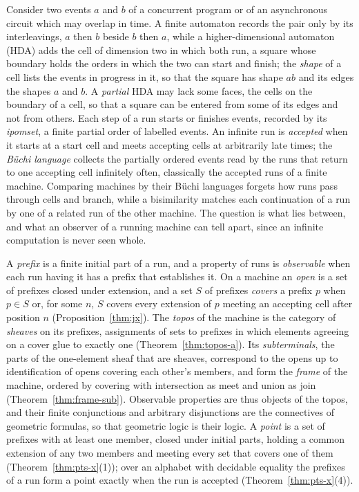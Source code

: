 \documentclass{lmcs}
\theoremstyle{definition}
\theoremstyle{remark}
\begin{document}
Consider two events $a$ and $b$ of a concurrent program or of an asynchronous circuit which may overlap in time. A
finite automaton records the pair only by its interleavings, $a$ then $b$ beside $b$ then $a$, while a
higher-dimensional automaton (HDA) adds the cell of dimension two in which both run, a square whose boundary holds the
orders in which the two can start and finish; the \emph{shape} of a cell lists the events in progress in it, so that
the square has shape $ab$ and its edges the shapes $a$ and $b$. A \emph{partial} HDA may lack some faces, the cells on
the boundary of a cell, so that a square can be entered from some of its edges and not from others. Each step of a run
starts or finishes events, recorded by its \emph{ipomset}, a finite partial order of labelled events. An infinite run
is \emph{accepted} when it starts at a start cell and meets accepting cells at arbitrarily late times; the
\emph{B\"uchi language} collects the partially ordered events read by the runs that return to one accepting cell
infinitely often, classically the accepted runs of a finite machine. Comparing machines by their B\"uchi languages forgets how
runs pass through cells and branch, while a bisimilarity matches each continuation of a run by one of a related run of
the other machine. The question is what lies between, and what an observer of a running machine can tell apart, since
an infinite computation is never seen whole.

A \emph{prefix} is a finite initial part of a run, and a property of runs is \emph{observable} when each run having it
has a prefix that establishes it. On a machine an \emph{open} is a set of prefixes closed under extension, and a set
$S$ of prefixes \emph{covers} a prefix $p$ when $p\in S$ or, for some $n$, $S$ covers every extension of $p$ meeting
an accepting cell after position $n$ (Proposition~\ref{thm:jx}). The \emph{topos} of the machine is the category of
\emph{sheaves} on its prefixes, assignments of sets to prefixes in which elements agreeing on a cover glue to exactly
one (Theorem~\ref{thm:topos-a}). Its \emph{subterminals}, the parts of the one-element sheaf that are sheaves,
correspond to the opens up to identification of opens covering each other's members, and form the \emph{frame} of the
machine, ordered by covering with intersection as meet and union as join (Theorem~\ref{thm:frame-sub}). Observable
properties are thus objects of the topos, and their finite conjunctions and arbitrary disjunctions are the connectives
of geometric formulas, so that geometric logic is their logic. A \emph{point} is a set of prefixes with at least one
member, closed under initial parts, holding a common extension of any two members and meeting every set that covers
one of them (Theorem~\ref{thm:pts-x}(1)); over an alphabet with decidable equality the prefixes of a run form a point
exactly when the run is accepted (Theorem~\ref{thm:pts-x}(4)).
\end{document}
